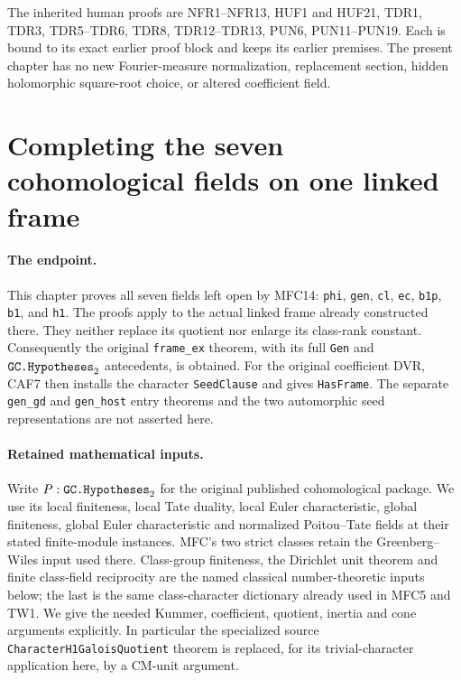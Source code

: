 \documentclass[11pt,a4paper]{article}
\numberwithin{equation}{section}
\theoremstyle{remark}\newtheorem{remark}[theorem]{Remark}
\begin{document}
The inherited human proofs are NFR1--NFR13, HUF1 and HUF21,
TDR1, TDR3, TDR5--TDR6, TDR8, TDR12--TDR13, PUN6,
PUN11--PUN19.  Each is bound to its exact earlier proof block
and keeps its earlier premises.  The present chapter has no
new Fourier-measure normalization, replacement section, hidden
holomorphic square-root choice, or altered coefficient field.
\par\endgroup


\section{Completing the seven cohomological fields on one linked frame}
\label{sec:linked-frame-completion}

\paragraph{The endpoint.}
This chapter proves all seven fields left open by MFC14:
\texttt{phi}, \texttt{gen}, \texttt{cl}, \texttt{ec},
\texttt{b1p}, \texttt{b1}, and \texttt{h1}.
The proofs apply to the actual linked frame already constructed there.
They neither replace its quotient nor enlarge its class-rank constant.
Consequently the original \texttt{frame\_\allowbreak ex} theorem, with its full
\texttt{Gen} and \(\texttt{GC.\allowbreak Hypotheses}_{2}\) antecedents, is obtained.
For the original coefficient DVR, CAF7 then installs the character
\texttt{Seed\allowbreak Clause} and gives \texttt{Has\allowbreak Frame}.
The separate \texttt{gen\_\allowbreak gd} and \texttt{gen\_\allowbreak host} entry theorems and
the two automorphic seed representations are not asserted here.

\paragraph{Retained mathematical inputs.}
Write \(P:\texttt{GC.\allowbreak Hypotheses}_{2}\) for the original published
cohomological package.  We use its local finiteness, local Tate
duality, local Euler characteristic, global finiteness, global Euler
characteristic and normalized Poitou--Tate fields at their stated
finite-module instances.  MFC's two strict classes retain the
Greenberg--Wiles input used there.  Class-group finiteness, the
Dirichlet unit theorem and finite class-field reciprocity are the
named classical number-theoretic inputs below; the last is the
same class-character dictionary already used in MFC5 and TW1.
We give the needed Kummer, coefficient, quotient, inertia and cone
arguments explicitly.  In particular the specialized source
\texttt{Character\allowbreak H1Galois\allowbreak Quotient} theorem is replaced, for its
trivial-character application here, by a CM-unit argument.
\end{document}
